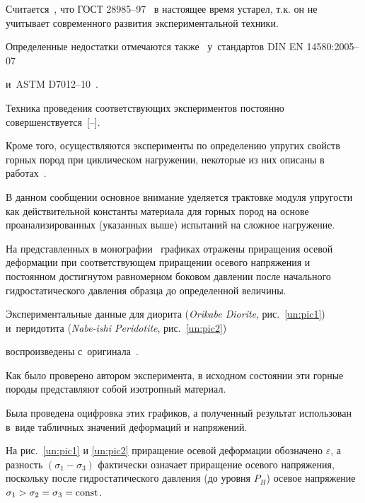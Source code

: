 Считается~\cite{ulg:bib:Suknev}, что ГОСТ 28985--97~\cite{ulg:bib:GOST} в настоящее время устарел, т.к. он не учитывает современного развития экспериментальной техники. 

Определенные недостатки отмечаются также~\cite{ulg:bib:Suknev} у~стандартов DIN EN 14580:2005–07~\cite{ulg:bib:DIN} 

и~ASTM D7012–10~\cite{ulg:bib:ASTM}. 

Техника проведения соответствующих экспериментов постоянно совершенствуется~[--].

Кроме того, осуществляются эксперименты по определению упругих свойств горных пород при циклическом нагружении, некоторые из них описаны в работах~\cite{ulg:bib:Mishra,ulg:bib:Li}. 



В данном сообщении основное внимание уделяется трактовке модуля упругости как действительной константы материала для горных пород на основе проанализированных (указанных выше) испытаний на сложное нагружение.



\smallskip




На представленных в монографии~\cite{ulg:bib:Mogi} графиках отражены приращения осевой деформации при соответствующем приращении осевого напряжения и постоянном достигнутом равномерном боковом давлении после начального гидростатического давления образца до определенной величины.

Экспериментальные данные для диорита  ({\it Orikabe Diorite}\/, рис.~\ref{un:pic1})  и~перидотита ({\it Nabe-ishi Peridotite}\/, рис.~\ref{un:pic2}) 

 воспроизведены с~оригинала~\cite{ulg:bib:Mogi}. 

Как было проверено автором эксперимента, в исходном состоянии эти горные породы представляют собой изотропный материал.

Была проведена оцифровка этих графиков, а полученный результат использован в~виде табличных значений деформаций и напряжений.



На рис.~\ref{un:pic1} и \ref{un:pic2} приращение осевой деформации обозначено $\varepsilon$, а разность $(\sigma_1-\sigma_3 )$ фактически означает приращение осевого напряжения, поскольку после гидростатического давления (до уровня $P_H$) осевое напряжение \mbox{$\sigma_1>\sigma_2=\sigma_3={\rm const}$.}



